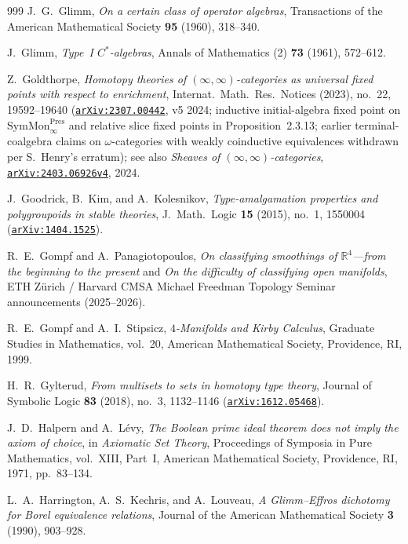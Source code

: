 \documentclass[10pt,twoside,openright]{book}
\theoremstyle{crmplain}
\theoremstyle{crmdef}
\theoremstyle{crmremark}
\begin{document}
\begin{thebibliography}{999}
J.~G.~Glimm,
\emph{On a certain class of operator algebras},
Transactions of the American Mathematical Society \textbf{95} (1960), 318--340.

J.~Glimm,
\emph{Type~I $C^*$-algebras},
Annals of Mathematics (2) \textbf{73} (1961), 572--612.

Z.~Goldthorpe,
\emph{Homotopy theories of $(\infty, \infty)$-categories as universal fixed points with respect to enrichment},
Internat.\ Math.\ Res.\ Notices (2023), no.~22, 19592--19640 (\href{https://arxiv.org/abs/2307.00442}{\texttt{arXiv:2307.00442}}, v5 2024; inductive initial-algebra fixed point on $\mathrm{SymMon}^{\mathrm{Pres}}_\infty$ and relative slice fixed points in Proposition~2.3.13; earlier terminal-coalgebra claims on $\omega$-categories with weakly coinductive equivalences withdrawn per S.~Henry's erratum); see also \emph{Sheaves of $(\infty, \infty)$-categories}, \href{https://arxiv.org/abs/2403.06926v4}{\texttt{arXiv:2403.06926v4}}, 2024.

J.~Goodrick, B.~Kim, and A.~Kolesnikov,
\emph{Type-amalgamation properties and polygroupoids in stable theories},
J.\ Math.\ Logic \textbf{15} (2015), no.~1, 1550004 (\href{https://arxiv.org/abs/1404.1525}{\texttt{arXiv:1404.1525}}).

R.~E.~Gompf and A.~Panagiotopoulos,
\emph{On classifying smoothings of $\mathbb{R}^4$---from the beginning to the present} and \emph{On the difficulty of classifying open manifolds},
ETH Z\"urich / Harvard CMSA Michael Freedman Topology Seminar announcements (2025--2026).

R.~E.~Gompf and A.~I.~Stipsicz,
\emph{$4$-Manifolds and Kirby Calculus},
Graduate Studies in Mathematics, vol.~20, American Mathematical Society, Providence, RI, 1999.

H.~R.~Gylterud,
\emph{From multisets to sets in homotopy type theory},
Journal of Symbolic Logic \textbf{83} (2018), no.~3, 1132--1146 (\href{https://arxiv.org/abs/1612.05468}{\texttt{arXiv:1612.05468}}).

J.~D.~Halpern and A.~L\'evy,
\emph{The Boolean prime ideal theorem does not imply the axiom of choice},
in \emph{Axiomatic Set Theory}, Proceedings of Symposia in Pure Mathematics, vol.~XIII, Part~I, American Mathematical Society, Providence, RI, 1971, pp.~83--134.

L.~A.~Harrington, A.~S.~Kechris, and A.~Louveau,
\emph{A Glimm--Effros dichotomy for Borel equivalence relations},
Journal of the American Mathematical Society \textbf{3} (1990), 903--928.


\end{thebibliography}
\end{document}
